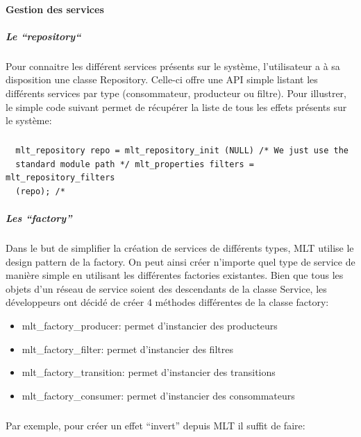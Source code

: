 \paragraph{Gestion des services}

\subparagraph{Le ``repository``}

Pour connaitre les différent services présents sur le système,
l'utilisateur a à sa disposition une classe Repository. Celle-ci offre
une API simple listant les différents services par type
(consommateur, producteur ou filtre).  Pour illustrer, le simple code
suivant permet de récupérer la liste de tous les effets présents sur
le système:

\subparagraph{}

\begin{lstlisting}
  mlt_repository repo = mlt_repository_init (NULL) /* We just use the
  standard module path */ mlt_properties filters = mlt_repository_filters
  (repo); /*
\end{lstlisting}

\subparagraph{Les ``factory''} Dans le but de simplifier la création de
services de différents types, MLT utilise le design pattern
de la factory. On peut ainsi créer n'importe quel type de service de
manière simple en utilisant les différentes factories existantes. Bien
que tous les objets d'un réseau de service soient des descendants de
la classe Service, les développeurs ont décidé de créer 4 méthodes
différentes de la classe factory:

\begin{itemize}

  \item {mlt\_factory\_producer: permet d'instancier des producteurs}

  \item {mlt\_factory\_filter: permet d'instancier des filtres}

  \item {mlt\_factory\_transition: permet d'instancier des transitions}

  \item {mlt\_factory\_consumer: permet d'instancier des consommateurs}

\end{itemize}

\subparagraph{}

Par exemple, pour créer un effet ``invert'' depuis MLT
il suffit de faire:

\subparagraph{}

